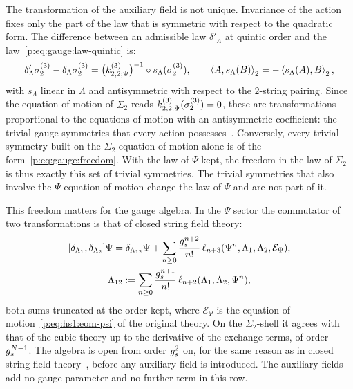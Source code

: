 The transformation of the auxiliary field is not unique.
Invariance of the action fixes only the part of the law that is symmetric with respect to the quadratic form.
  The difference between an admissible law $\delta'_\Lambda$ at quintic order and the law~\eqref{p:eq:gauge:law-quintic} is:
\begin{equation}
  \label{p:eq:gauge:freedom}
  \delta'_\Lambda \sigma_2^{(3)} - \delta_\Lambda \sigma_2^{(3)}
    = \big( \kin{2}{\Psi}{3} \big)^{-1} \circ s_\Lambda (\sigma_2^{(3)}),
  \qquad
  \pair[2]{A}{s_\Lambda(B)}
    = - \pair[2]{s_\Lambda(A)}{B},
\end{equation}
with $s_\Lambda$ linear in $\Lambda$ and antisymmetric with respect to the $2$-string pairing.
Since the equation of motion of $\Sigma_2$ reads $\kin{2}{\Psi}{3}(\sigma_2^{(3)}) = 0$, these are transformations proportional to the equations of motion with an antisymmetric coefficient: the trivial gauge symmetries that every action possesses~\cite[ch.~3]{Henneaux:1994:QuantizationGaugeSystems}.
Conversely, every trivial symmetry built on the $\Sigma_2$ equation of motion alone is of the form~\eqref{p:eq:gauge:freedom}.
  With the law of $\Psi$ kept, the freedom in the law of $\Sigma_2$ is thus exactly this set of trivial symmetries.
  The trivial symmetries that also involve the $\Psi$ equation of motion change the law of $\Psi$ and are not part of it.

This freedom matters for the gauge algebra.
In the $\Psi$ sector the commutator of two transformations is that of closed string field theory:
\begin{equation}
  \label{p:eq:gauge:algebra-psi}
  \begin{gathered}
    [\delta_{\Lambda_1}, \delta_{\Lambda_2}] \Psi
      = \delta_{\Lambda_{12}} \Psi
        + \sum_{n \ge 0} \frac{\gs^{n+2}}{n!} \, \ell_{n+3}(\Psi^n, \Lambda_1, \Lambda_2, \mathcal E_\Psi),
    \\
    \Lambda_{12}
      := \sum_{n \ge 0} \frac{\gs^{n+1}}{n!} \, \ell_{n+2}(\Lambda_1, \Lambda_2, \Psi^n),
  \end{gathered}
\end{equation}
both sums truncated at the order kept, where $\mathcal E_\Psi$ is the equation of motion~\eqref{p:eq:hs1:eom-psi} of the original theory.
On the $\Sigma_2$-shell it agrees with that of the cubic theory up to the derivative of the exchange terms, of order $g_s^{N-1}$.
The algebra is open from order $g_s^2$ on, for the same reason as in closed string field theory~\cite{Zwiebach:1993:ClosedStringField}, before any auxiliary field is introduced.
  The auxiliary fields add no gauge parameter and no further term in this row.



